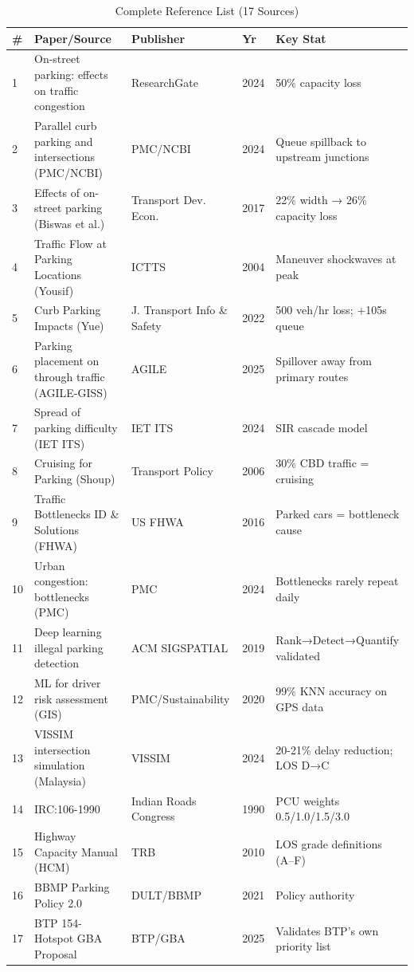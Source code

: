 \documentclass[12pt,a4paper]{article}
\begin{document}
\begin{table}[H]
\centering
\caption{Complete Reference List (17 Sources)}
\small
\begin{tabular}{p{0.5cm}p{6cm}p{3cm}p{1cm}p{3cm}}
\toprule
\textbf{\#} & \textbf{Paper/Source} & \textbf{Publisher} & \textbf{Yr} & \textbf{Key Stat} \\
\midrule
1 & On-street parking: effects on traffic congestion & ResearchGate & 2024 & 50\% capacity loss \\
2 & Parallel curb parking and intersections (PMC/NCBI) & PMC/NCBI & 2024 & Queue spillback to upstream junctions \\
3 & Effects of on-street parking (Biswas et al.) & Transport Dev. Econ. & 2017 & 22\% width → 26\% capacity loss \\
4 & Traffic Flow at Parking Locations (Yousif) & ICTTS & 2004 & Maneuver shockwaves at peak \\
5 & Curb Parking Impacts (Yue) & J. Transport Info \& Safety & 2022 & 500 veh/hr loss; +105s queue \\
6 & Parking placement on through traffic (AGILE-GISS) & AGILE & 2025 & Spillover away from primary routes \\
7 & Spread of parking difficulty (IET ITS) & IET ITS & 2024 & SIR cascade model \\
8 & Cruising for Parking (Shoup) & Transport Policy & 2006 & 30\% CBD traffic = cruising \\
9 & Traffic Bottlenecks ID \& Solutions (FHWA) & US FHWA & 2016 & Parked cars = bottleneck cause \\
10 & Urban congestion: bottlenecks (PMC) & PMC & 2024 & Bottlenecks rarely repeat daily \\
11 & Deep learning illegal parking detection & ACM SIGSPATIAL & 2019 & Rank→Detect→Quantify validated \\
12 & ML for driver risk assessment (GIS) & PMC/Sustainability & 2020 & 99\% KNN accuracy on GPS data \\
13 & VISSIM intersection simulation (Malaysia) & VISSIM & 2024 & 20-21\% delay reduction; LOS D→C \\
14 & IRC:106-1990 & Indian Roads Congress & 1990 & PCU weights 0.5/1.0/1.5/3.0 \\
15 & Highway Capacity Manual (HCM) & TRB & 2010 & LOS grade definitions (A--F) \\
16 & BBMP Parking Policy 2.0 & DULT/BBMP & 2021 & Policy authority \\
17 & BTP 154-Hotspot GBA Proposal & BTP/GBA & 2025 & Validates BTP's own priority list \\
\bottomrule
\end{tabular}
\end{table}
\end{document}

